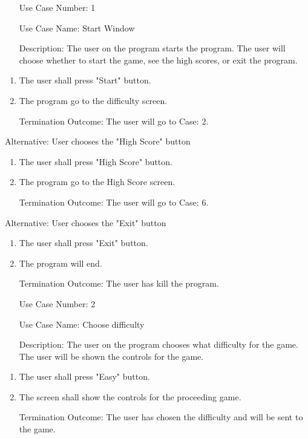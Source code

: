 \documentclass[10pt,conference,onecolumn,compsoc]{IEEEtran}
\begin{document}
\begin{itemize}
\item[Use Case Number:] 1
\item[Use Case Name:] Start Window
\item[Description:] The user on the program starts the program. The user will choose whether to start the game, see the high scores, or exit the program.
\end{itemize}
\begin{enumerate}
\item The user shall press "Start" button.
\item The program go to the difficulty screen.
\item[Termination Outcome:] The user will go to Case: 2.
\end{enumerate}
Alternative: User chooses the "High Score" button
\begin{enumerate}
\item The user shall press "High Score" button.
\item The program go to the High Score screen.
\item[Termination Outcome:] The user will go to Case: 6.
\end{enumerate}
Alternative: User chooses the "Exit" button
\begin{enumerate}
\item The user shall press "Exit" button.
\item The program will end.
\item[Termination Outcome:] The user has kill the program.
\end{enumerate}


\begin{itemize}
\item[Use Case Number:] 2
\item[Use Case Name:] Choose difficulty
\item[Description:] The user on the program chooses what difficulty for the game. The user will be shown the controls for the game.
\end{itemize}

\begin{enumerate}
\item The user shall press "Easy" button.
\item The screen shall show the controls for the proceeding game.
\item[Termination Outcome:] The user has chosen the difficulty and will be sent to the game.
\end{enumerate}
\end{document}
